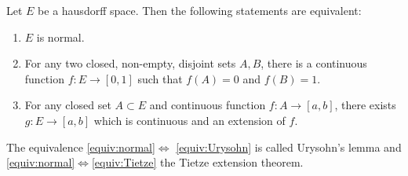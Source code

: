 \begin{theorem}\label{thm:tietze-urysohn}
	Let $E$ be a hausdorff space. Then the following statements are equivalent:
	\begin{enumerate}\renewcommand{\theenumi}{(\roman{enumi})}
	\item \label{equiv:normal} $E$ is normal.
	\item \label{equiv:Urysohn}For any two closed, non-empty, disjoint sets $A,B$, there is a continuous function $f:E\to [0,1]$ such that $f(A)=0$ and $f(B)=1$.
	\item\label{equiv:Tietze} For any closed set $A\subset E$ and continuous function $f: A\to [a,b]$, there exists $g: E\to [a,b]$ which is continuous and an extension of $f$.
	\end{enumerate}
\end{theorem}
The equivalence \ref{equiv:normal}$\Leftrightarrow$ \ref{equiv:Urysohn} is called Urysohn's lemma and \ref{equiv:normal}$\Leftrightarrow$\ref{equiv:Tietze} the Tietze extension theorem.
